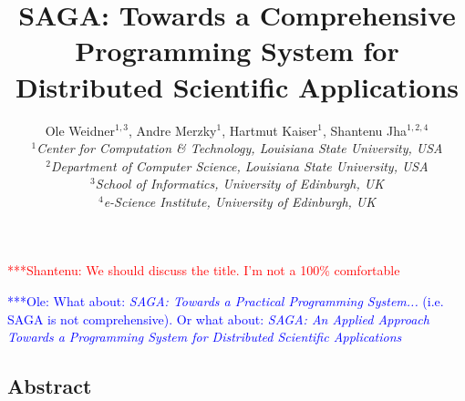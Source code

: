 \documentclass[a4paper,10pt]{article}
\newcommand{\jhanote}[1]{  {\textcolor{red}     { ***Shantenu: #1 }}}
\newcommand{\onote}[1]{  {\textcolor{blue}     { ***Ole: #1 }}}
\newcommand{\jhanote}[1]{}
\newcommand{\onote}[1]{}
\begin{document}
 \title{ \large \vspace{-3.5em} SAGA: Towards a Comprehensive
   Programming System for Distributed Scientific Applications }
 \jhanote{We should discuss the title. I'm not a 100\% comfortable}
 
 \onote{What about: \textit{SAGA: Towards a Practical Programming System...} (i.e. SAGA is not 
 comprehensive). Or what about: \textit{SAGA: An Applied Approach Towards a
   Programming System for Distributed Scientific Applications}}

 
 \author{\normalsize Ole Weidner$^{1,3}$, Andre Merzky$^{1}$, Hartmut Kaiser$^{1}$, Shantenu Jha$^{1,2,4}$\\
   \small{\emph{$^{1}$Center for Computation \& Technology, Louisiana State University, USA}}\\
   \small{\emph{$^{2}$Department of Computer Science, Louisiana State University, USA}}\\
   \small{\emph{$^{3}$School of Informatics, University of Edinburgh, UK}}\\
   \small{\emph{$^{4}$e-Science Institute, University of Edinburgh, UK}}
 }
 \date{}
 \maketitle
 




\subsection*{Abstract}
\end{document}

